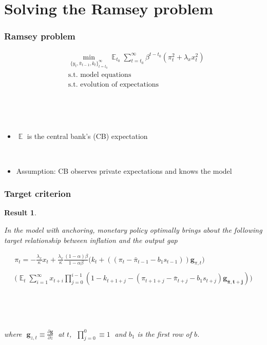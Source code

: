 \documentclass[10pt]{beamer}
\DeclareMathOperator{\E}{\mathbb{E}}
\newtheorem{result}{Result}
\begin{document}
\section{Solving the Ramsey problem}

\begin{frame}
	\frametitle{Ramsey problem}
	 \begin{align*}
& \min_{ \{y_t, \bar{\pi}_{t-1}, k_t \}_{t=t_0}^{\infty}} \E_{t_0}\sum_{t=t_0}^{\infty} \beta^{t-t_0} (\pi_t^2  + \lambda_x x_t^2 )  \\
& \text{s.t. model equations} \\
& \text{s.t. evolution of expectations} 
\end{align*}

\

\

\begin{itemize}
\item $\E$ is the central bank's (CB) expectation

\

\item Assumption: CB observes private expectations and knows the model
\end{itemize}

 

\end{frame}


\begin{frame}
	\frametitle{Target criterion}
	\label{anchTC}
	
	\begin{result} 

\

In the model with anchoring, monetary policy optimally brings about the following target relationship between inflation and the output gap
	
\begin{align*}
\pi_t  = -\frac{\lambda_x}{\kappa}x_t + \frac{\lambda_x}{\kappa}\frac{(1-\alpha)\beta}{1-\alpha\beta} \bigg(k_t+((\pi_t - \bar{\pi}_{t-1}-b_1 s_{t-1}))\mathbf{g}_{\pi,t}\bigg) \\
\\
\bigg(\E_t\sum_{i=1}^{\infty}x_{t+i}\prod_{j=0}^{i-1}(1-k_{t+1+j} - (\pi_{t+1+j} - \bar{\pi}_{t+j}-b_1 s_{t+j})\mathbf{g_{\bar{\pi}, t+j}}) \bigg)
 \label{target}
\end{align*}

\

\

where $\; \mathbf{g}_{z,t} \equiv \frac{\partial \mathbf{g}}{\partial z}\;$ at $t$, $\; \prod_{j=0}^{0} \equiv 1 \; $ and $b_1$ is the first row of $b$.
	\end{result}

\vspace{-0.1cm}

\hfill \hyperlink{generalTC}{}

\end{frame}
\end{document}
